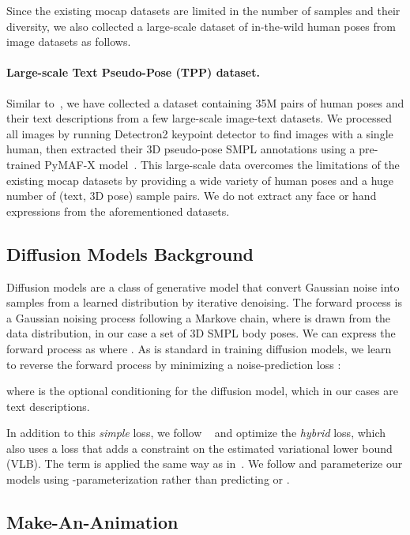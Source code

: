 \documentclass[10pt,twocolumn,letterpaper]{article}
\begin{document}
Since the existing mocap datasets are limited in the number of samples and their diversity, we also collected a large-scale dataset of in-the-wild human poses from image datasets as follows. 
\paragraph{Large-scale Text Pseudo-Pose (TPP) dataset.} Similar to~\cite{azadi2023text}, we have collected a dataset containing 35M pairs of human poses and their text descriptions from a few large-scale image-text datasets. We processed all images by running Detectron2 keypoint detector to find images with a single human, then extracted their 3D pseudo-pose SMPL annotations using a
pre-trained PyMAF-X model~\cite{pymafx}. This large-scale data overcomes the limitations of the existing mocap datasets by
providing a wide variety of human poses and a huge number of
(text, 3D pose) sample pairs. We do not extract any face or hand expressions from the aforementioned datasets.



\subsection{Diffusion Models Background}
Diffusion models are a class of generative model that convert Gaussian noise into samples from a learned distribution by iterative denoising. The forward process is a Gaussian noising process following a Markove chain,  where  is drawn from the data distribution, in our case a set of 3D SMPL body poses. We can express the forward process as 
 where . As is standard in training diffusion models, we learn to reverse the forward process by minimizing a noise-prediction loss \cite{ddpms}:
 
where  is the optional conditioning for the diffusion model, which in our cases are text descriptions.

In addition to this {\textit{simple}} loss, we follow ~\cite{nichol2021improved,ramesh2022dalle2} and optimize the {\textit{hybrid}} loss, which also uses a loss  that adds a constraint on the estimated variational lower bound (VLB). The  term is applied the same way as in~\cite{nichol2021improved}. We follow \cite{ImagenVid, progdistill} and parameterize our models using -parameterization  rather than predicting  or .

\subsection{Make-An-Animation}
\end{document}
